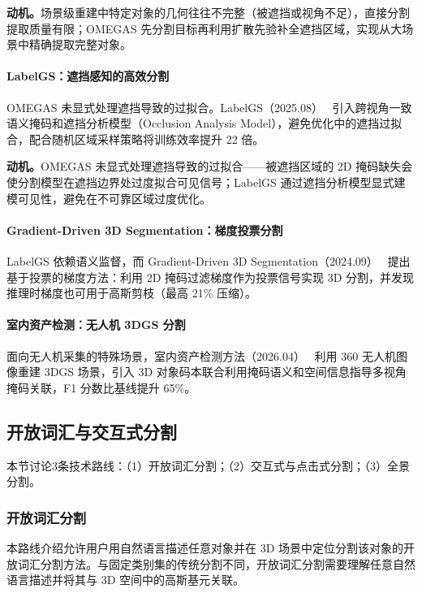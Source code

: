 \textbf{动机。}场景级重建中特定对象的几何往往不完整（被遮挡或视角不足），直接分割提取质量有限；OMEGAS 先分割目标再利用扩散先验补全遮挡区域，实现从大场景中精确提取完整对象。

\paragraph{LabelGS：遮挡感知的高效分割} OMEGAS 未显式处理遮挡导致的过拟合。LabelGS（2025.08）~\cite{2508_19699} 引入跨视角一致语义掩码和遮挡分析模型（Occlusion Analysis Model），避免优化中的遮挡过拟合，配合随机区域采样策略将训练效率提升 22 倍。

\textbf{动机。}OMEGAS 未显式处理遮挡导致的过拟合——被遮挡区域的 2D 掩码缺失会使分割模型在遮挡边界处过度拟合可见信号；LabelGS 通过遮挡分析模型显式建模可见性，避免在不可靠区域过度优化。

\paragraph{Gradient-Driven 3D Segmentation：梯度投票分割} LabelGS 依赖语义监督，而 Gradient-Driven 3D Segmentation（2024.09）~\cite{2409_11681} 提出基于投票的梯度方法：利用 2D 掩码过滤梯度作为投票信号实现 3D 分割，并发现推理时梯度也可用于高斯剪枝（最高 21\% 压缩）。

\paragraph{室内资产检测：无人机 3DGS 分割} 面向无人机采集的特殊场景，室内资产检测方法（2026.04）~\cite{2604_05316} 利用 360\textdegree{} 无人机图像重建 3DGS 场景，引入 3D 对象码本联合利用掩码语义和空间信息指导多视角掩码关联，F1 分数比基线提升 65\%。

\subsection{开放词汇与交互式分割}
\label{ss:10_2}

本节讨论3条技术路线：（1）开放词汇分割；（2）交互式与点击式分割；（3）全景分割。

\subsubsection{开放词汇分割}

本路线介绍允许用户用自然语言描述任意对象并在 3D 场景中定位分割该对象的开放词汇分割方法。与固定类别集的传统分割不同，开放词汇分割需要理解任意自然语言描述并将其与 3D 空间中的高斯基元关联。

